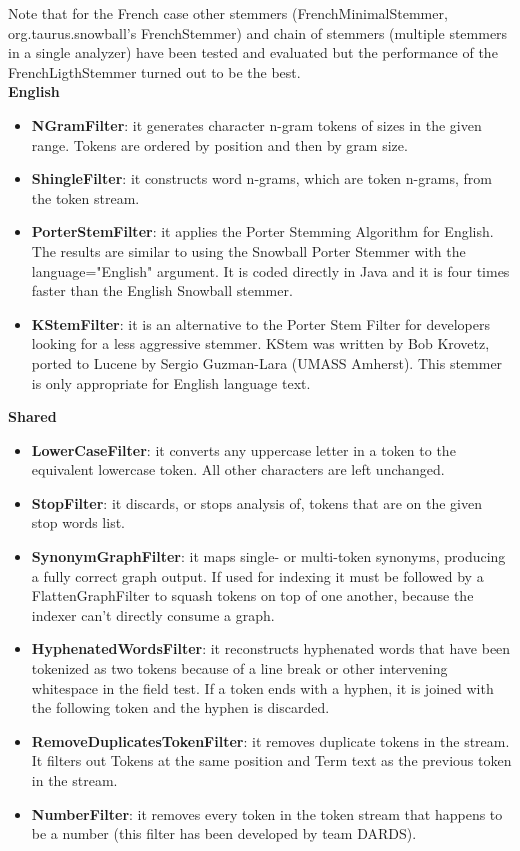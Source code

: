 Note that for the French case other stemmers (FrenchMinimalStemmer, org.taurus.snowball's FrenchStemmer) and chain of stemmers (multiple stemmers in a single analyzer) have been tested and evaluated but the performance of the FrenchLigthStemmer turned out to be the best.
\\
\textbf{English}
\begin{itemize}
    \item \textbf{NGramFilter}: it generates character n-gram tokens of sizes in the given range. Tokens are ordered by position and then by gram size.
    \item \textbf{ShingleFilter}: it constructs word n-grams, which are token n-grams, from the token stream.
    \item \textbf{PorterStemFilter}: it applies the Porter Stemming Algorithm for English. The results are similar to using the Snowball Porter Stemmer with the language="English" argument. It is coded directly in Java and it is four times faster than the English Snowball stemmer.
    \item \textbf{KStemFilter}: it is an alternative to the Porter Stem Filter for developers looking for a less aggressive stemmer. KStem was written by Bob Krovetz, ported to Lucene by Sergio Guzman-Lara (UMASS Amherst). This stemmer is only appropriate for English language text.
\end{itemize}

\textbf{Shared}
\begin{itemize}
    \item \textbf{LowerCaseFilter}: it converts any uppercase letter in a token to the equivalent lowercase token. All other characters are left unchanged.
    \item \textbf{StopFilter}: it discards, or stops analysis of, tokens that are on the given stop words list.
    \item \textbf{SynonymGraphFilter}: it maps single- or multi-token synonyms, producing a fully correct graph output. If used for indexing it must be followed by a FlattenGraphFilter to squash tokens on top of one another, because the indexer can’t directly consume a graph.
    \item \textbf{HyphenatedWordsFilter}: it reconstructs hyphenated words that have been tokenized as two tokens because of a line break or other intervening whitespace in the field test. If a token ends with a hyphen, it is joined with the following token and the hyphen is discarded.
    \item \textbf{RemoveDuplicatesTokenFilter}: it removes duplicate tokens in the stream. It filters out Tokens at the same position and Term text as the previous token in the stream.

    \item \textbf{NumberFilter}: it removes every token in the token stream that happens to be a number (this filter has been developed by team DARDS).
\end{itemize}


